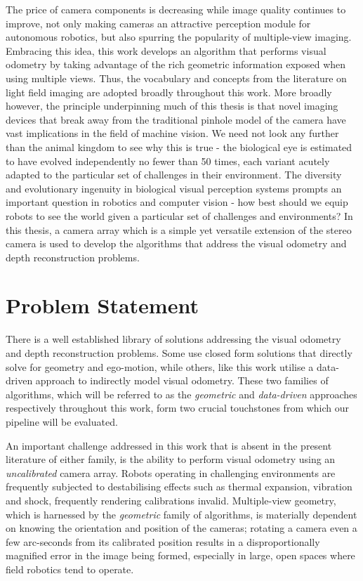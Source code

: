 The price of camera components is decreasing while image quality continues to improve, not only making cameras an attractive perception module for autonomous robotics, but also spurring the popularity of multiple-view imaging. Embracing this idea, this work develops an algorithm that performs visual odometry by taking advantage of the rich geometric information exposed when using multiple views. Thus, the vocabulary and concepts from the literature on light field imaging are adopted broadly throughout this work. More broadly however, the principle underpinning much of this thesis is that novel imaging devices that break away from the traditional pinhole model of the camera have vast implications in the field of machine vision. We need not look any further than the animal kingdom to see why this is true - the biological eye is estimated to have evolved independently no fewer than 50 times, each variant acutely adapted to the particular set of challenges in their environment. The diversity and evolutionary ingenuity in biological visual perception systems prompts an important question in robotics and computer vision - how best should we equip robots to see the world given a particular set of challenges and environments? In this thesis, a camera array which is a simple yet versatile extension of the stereo camera is used to develop the algorithms that address the visual odometry and depth reconstruction problems. 



\section{Problem Statement}

There is a well established library of solutions addressing the visual odometry and depth reconstruction problems. Some use closed form solutions that directly solve for geometry and ego-motion, while others, like this work utilise a data-driven approach to indirectly model visual odometry. These two families of algorithms, which will be referred to as the \textit{geometric} and \textit{data-driven} approaches respectively throughout this work, form two crucial touchstones from which our pipeline will be evaluated. 

An important challenge addressed in this work that is absent in the present literature of either family, is the ability to perform visual odometry using an \textit{uncalibrated} camera array. Robots operating in challenging environments are frequently subjected to destabilising effects such as thermal expansion, vibration and shock, frequently rendering calibrations invalid. Multiple-view geometry, which is harnessed by the \textit{geometric} family of algorithms, is materially dependent on knowing the orientation and position of the cameras; rotating a camera even a few arc-seconds from its calibrated position results in a disproportionally magnified error in the image being formed, especially in large, open spaces where field robotics tend to operate. 


